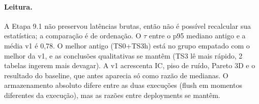 \paragraph{Leitura.} A Etapa 9.1 não preservou latências brutas, então não é possível recalcular sua estatística; a comparação é de ordenação. O $\tau$ entre o p95 mediano antigo e a média v1 é 0,78. O melhor antigo (TS0+TS3h) está no grupo empatado com o melhor da v1, e as conclusões qualitativas se mantêm (TS3 lê mais rápido, 2 tabelas ingerem mais devagar). A v1 acrescenta IC, piso de ruído, Pareto 3D e o resultado do baseline, que antes aparecia só como razão de medianas. O armazenamento absoluto difere entre as duas execuções (flush em momentos diferentes da execução), mas as razões entre deployments se mantêm.

